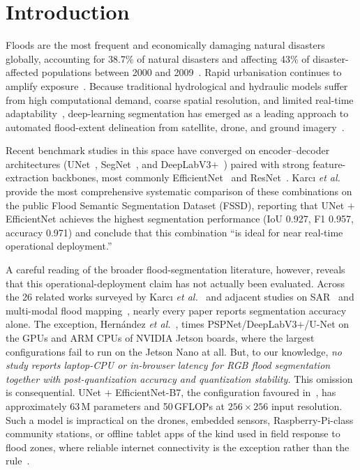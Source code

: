 
\section{Introduction}
\label{sec:intro}

Floods are the most frequent and economically damaging natural disasters globally, accounting for 38.7\% of natural disasters and affecting 43\% of disaster-affected populations between 2000 and 2009~\cite{du2010health}. Rapid urbanisation continues to amplify exposure~\cite{hemmati2020urban}. Because traditional hydrological and hydraulic models suffer from high computational demand, coarse spatial resolution, and limited real-time adaptability~\cite{kumar2023flood}, deep-learning segmentation has emerged as a leading approach to automated flood-extent delineation from satellite, drone, and ground imagery~\cite{bentivoglio2022deep}.

Recent benchmark studies in this space have converged on encoder--decoder architectures (UNet~\cite{ronneberger2015unet}, SegNet~\cite{badrinarayanan2017segnet}, and DeepLabV3$+$~\cite{chen2018encoder}) paired with strong feature-extraction backbones, most commonly EfficientNet~\cite{tan2019efficientnet} and ResNet~\cite{he2016deep}. Karc{\i} \emph{et al.}~\cite{karci2026deep} provide the most comprehensive systematic comparison of these combinations on the public Flood Semantic Segmentation Dataset (FSSD), reporting that UNet $+$ EfficientNet achieves the highest segmentation performance (IoU 0.927, F1 0.957, accuracy 0.971) and conclude that this combination ``is ideal for near real-time operational deployment.''

A careful reading of the broader flood-segmentation literature, however, reveals that this operational-deployment claim has not actually been evaluated. Across the 26 related works surveyed by Karc{\i} \emph{et al.}~\cite{karci2026deep} and adjacent studies on SAR~\cite{pechmay2023flooded} and multi-modal flood mapping~\cite{chamatidis2024vision}, nearly every paper reports segmentation accuracy alone. The exception, Hern\'andez \emph{et al.}~\cite{hernandez2022flood}, times PSPNet/DeepLabV3$+$/U-Net on the GPUs and ARM CPUs of NVIDIA Jetson boards, where the largest configurations fail to run on the Jetson Nano at all. But, to our knowledge, \emph{no study reports laptop-CPU or in-browser latency for RGB flood segmentation together with post-quantization accuracy and quantization stability.} This omission is consequential. UNet $+$ EfficientNet-B7, the configuration favoured in~\cite{karci2026deep}, has approximately 63\,M parameters and 50\,GFLOPs at $256{\times}256$ input resolution. Such a model is impractical on the drones, embedded sensors, Raspberry-Pi-class community stations, or offline tablet apps of the kind used in field response to flood zones, where reliable internet connectivity is the exception rather than the rule~\cite{munawar2021review}.

